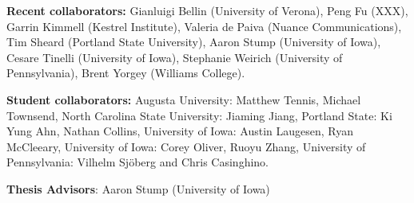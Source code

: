 \textbf{Recent collaborators:} Gianluigi Bellin (University of
Verona), Peng Fu (XXX), Garrin Kimmell (Kestrel Institute), Valeria de
Paiva (Nuance Communications), Tim Sheard (Portland State University),
Aaron Stump (University of Iowa), Cesare Tinelli (University of Iowa),
Stephanie Weirich (University of Pennsylvania), Brent Yorgey (Williams
College).

\textbf{Student collaborators:} Augusta University: Matthew Tennis,
Michael Townsend, North Carolina State University: Jiaming Jiang,
Portland State: Ki Yung Ahn, Nathan Collins, University of Iowa:
Austin Laugesen, Ryan McCleeary, University of Iowa: Corey Oliver,
Ruoyu Zhang, University of Pennsylvania: Vilhelm Sjöberg and Chris
Casinghino.

\textbf{Thesis Advisors}: Aaron Stump (University of Iowa)
